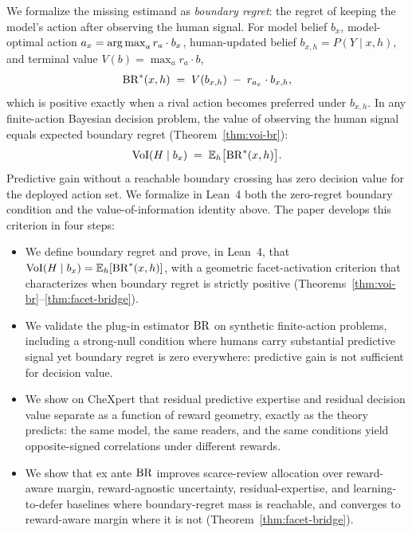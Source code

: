 We formalize the missing estimand as \emph{boundary regret}: the regret of keeping the model's action after observing the human signal.
For model belief $b_x$, model-optimal action $a_x = \operatorname*{arg\,max}_a r_a \cdot b_x$, human-updated belief $b_{x,h} = P(Y \mid x, h)$, and terminal value $V(b) = \max_a r_a \cdot b$,
\begin{equation}
  \operatorname{BR}^{*}(x, h) \;=\; V(b_{x,h}) \;-\; r_{a_x} \cdot b_{x,h},
\end{equation}
which is positive exactly when a rival action becomes preferred under $b_{x,h}$.
In any finite-action Bayesian decision problem, the value of observing the human signal equals expected boundary regret (Theorem~\ref{thm:voi-br}):
\begin{equation}
  \operatorname{VoI}(H \mid b_x) \;=\; \mathbb{E}_h\bigl[\operatorname{BR}^{*}(x, h)\bigr].
\end{equation}
Predictive gain without a reachable boundary crossing has zero decision value for the deployed action set.
We formalize in Lean~4 both the zero-regret boundary condition and the value-of-information identity above.
The paper develops this criterion in four steps:
\begin{itemize}[nosep,leftmargin=1.5em]
  \item We define boundary regret and prove, in Lean~4, that $\operatorname{VoI}(H \mid b_x) = \mathbb{E}_h[\operatorname{BR}^{*}(x,h)]$, with a geometric facet-activation criterion that characterizes when boundary regret is strictly positive (Theorems~\ref{thm:voi-br}--\ref{thm:facet-bridge}).
  \item We validate the plug-in estimator $\operatorname{BR}$ on synthetic finite-action problems, including a strong-null condition where humans carry substantial predictive signal yet boundary regret is zero everywhere: predictive gain is not sufficient for decision value.
  \item We show on CheXpert that residual predictive expertise and residual decision value separate as a function of reward geometry, exactly as the theory predicts: the same model, the same readers, and the same conditions yield opposite-signed correlations under different rewards.
  \item We show that ex ante $\operatorname{BR}$ improves scarce-review allocation over reward-aware margin, reward-agnostic uncertainty, residual-expertise, and learning-to-defer baselines where boundary-regret mass is reachable, and converges to reward-aware margin where it is not (Theorem~\ref{thm:facet-bridge}).
\end{itemize}
